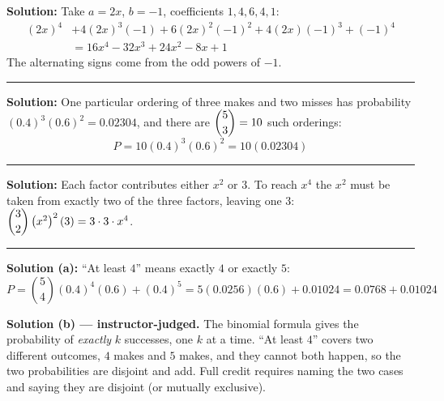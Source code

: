 \documentclass[12pt]{article}
\begin{document}

\textbf{Solution:} \quad Take $a = 2x$, $b = -1$, coefficients $1, 4, 6, 4, 1$:
\begin{align*}
(2x)^4 &+ 4(2x)^3(-1) + 6(2x)^2(-1)^2 + 4(2x)(-1)^3 + (-1)^4 \\
&= 16x^4 - 32x^3 + 24x^2 - 8x + 1
\end{align*}
The alternating signs come from the odd powers of $-1$. 

\vspace{0.15cm}\noindent\rule{\linewidth}{0.2pt}\vspace{0.15cm}


\textbf{Solution:} \quad One particular ordering of three makes and two misses has probability
$(0.4)^3(0.6)^2 = 0.02304$, and there are $\dbinom{5}{3} = 10$ such orderings:
\[ P = 10(0.4)^3(0.6)^2 = 10(0.02304) \]

\vspace{0.15cm}\noindent\rule{\linewidth}{0.2pt}\vspace{0.15cm}


\textbf{Solution:} \quad Each factor contributes either $x^2$ or $3$. To reach $x^4$ the $x^2$
must be taken from exactly two of the three factors, leaving one $3$:
$\dbinom{3}{2}\left(x^2\right)^2(3) = 3 \cdot 3 \cdot x^4$. 

\vspace{0.15cm}\noindent\rule{\linewidth}{0.2pt}\vspace{0.15cm}


\textbf{Solution (a):} \quad ``At least $4$'' means exactly $4$ or exactly $5$:
\[ P = \binom{5}{4}(0.4)^4(0.6) + (0.4)^5 = 5(0.0256)(0.6) + 0.01024 = 0.0768 + 0.01024 \]

\textbf{Solution (b) --- instructor-judged.} \quad The binomial formula gives the probability
of \emph{exactly} $k$ successes, one $k$ at a time. ``At least $4$'' covers two different
outcomes, $4$ makes and $5$ makes, and they cannot both happen, so the two probabilities are
disjoint and add. Full credit requires naming the two cases and saying they are disjoint (or
mutually exclusive).
\end{document}
